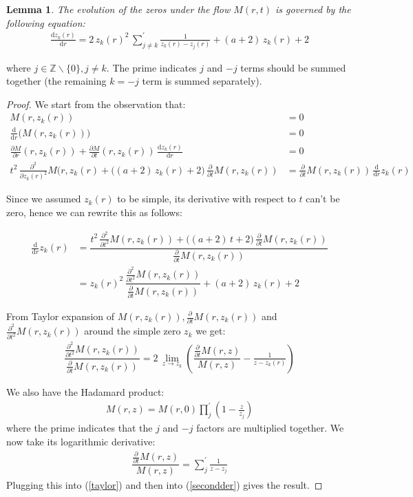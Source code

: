 \documentclass[a4paper,11pt,twoside]{amsart}
\newtheorem{lemma}[theorem]{Lemma}
\begin{document}
\begin{lemma}\label{proofBes2} The evolution of the zeros under the flow $M(r,t)$ is governed by the following equation:
\begin{align}
 \frac{\mathrm{d} z_k(r)}{\mathrm{d} r} =2\, z_k(r)^2\,\sum_{j \ne k}^{'} \frac{1}{z_k(r)-z_j(r)} +(a+2)\,z_k(r)+2
\end{align}
\end{lemma}
where $j \in \mathbb{Z}\backslash\{0\}, j \ne k$. The prime indicates $j$ and $-j$ terms should be summed together (the remaining $k=-j$ term is summed separately).
\begin{proof}
We start from the observation that:
\begin{align}
M(r,z_k(r)) &= 0 \\
\frac{\mathrm{d}}{\mathrm{d} r} \big(M(r,z_k(r))\big) &= 0 \\
\frac{\partial M}{\partial r}(r,z_k(r))+ \frac{\partial M}{\partial t}(r,z_k(r))\,\frac{\mathrm{d} z_k(r)}{\mathrm{d} r} &= 0 \\
t^2\,\frac{\partial^2}{\partial z_k(r)^2}M(r,z_k(r) + \big((a+2)\,z_k(r)+2\big)\,\frac{\partial }{\partial t}M(r,z_k(r))  &= \frac{\partial}{\partial t}M(r,z_k(r))\,\frac{\mathrm{d}}{\mathrm{d} r}z_k(r)
\end{align}

Since we assumed $z_k(r)$ to be simple, its derivative with respect to $t$ can't be zero, hence we can rewrite this as follows:

\begin{align}
\frac{\mathrm{d} }{\mathrm{d} r}z_k(r) &= \dfrac{t^2\,\frac{\partial^2}{\partial t^2}M(r,z_k(r)) + \big((a+2)\,t+2\big)\,\frac{\partial }{\partial t}M(r,z_k(r))}{ \frac{\partial}{\partial t}M(r,z_k(r))} \\
&= z_k(r)^2\,\dfrac{\frac{\partial^2}{\partial t^2}M(r,z_k(r))}{ \frac{\partial}{\partial t}M(r,z_k(r))}  + (a+2)\,z_k(r)+2 \label{secondder}
\end{align}

From Taylor expansion of $M(r,z_k(r)), \frac{\partial}{\partial t}M(r,z_k(r))$ and $\frac{\partial^2}{\partial t^2}M(r,z_k(r))$ around the simple zero $z_k$ we get:
\begin{align}\label{taylor}
 \dfrac{\frac{\partial^2}{\partial t^2}M(r,z_k(r))}{\frac{\partial}{\partial t}M(r,z_k(r))} = 2\,\lim_{z\to z_k} \left(\dfrac{\frac{\partial}{\partial t}M(r,z)}{M(r,z)} -\frac{1}{z - z_k(r)} \right)
\end{align}

We also have the Hadamard product: 
\begin{align}
  M(r,z) = M(r,0)\prod_j^{'}\left(1-\frac{z}{z_j}\right)
\end{align}
where the prime indicates that the $j$ and $-j$ factors are multiplied together. We now take its logarithmic derivative:
\begin{align}
  \dfrac{\frac{\partial}{\partial t}M(r,z)}{M(r,z)} = \sum_j^{'} \frac{1}{z-z_j}
\end{align}
Plugging this into (\ref{taylor}) and then into (\ref{secondder}) gives the result.
\end{proof}
\end{document}
